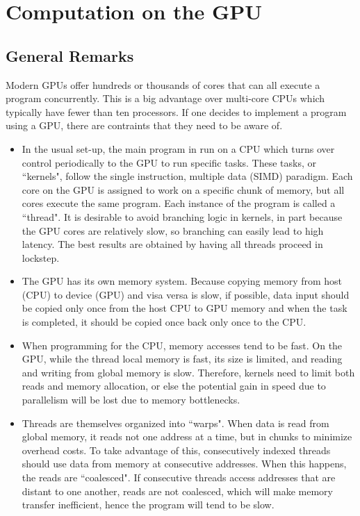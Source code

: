 \section{Computation on the GPU}
\label{sec:computation}
\subsection{General Remarks}
Modern GPUs offer hundreds or thousands of cores that can all execute a program concurrently. This is a big advantage over multi-core CPUs which typically have fewer than ten processors. If one decides to implement a program using a GPU, there are contraints that they need to be aware of.
\begin{itemize}
\item
In the usual set-up, the main program in run on a CPU which turns over control periodically to the GPU to run specific tasks. These tasks, or ``kernels", follow the single instruction, multiple data (SIMD) paradigm. Each core on the GPU is assigned to work on a specific chunk of memory, but all cores execute the same program. Each instance of the program is called a ``thread". It is desirable to avoid branching logic in kernels, in part because the GPU cores are relatively slow, so branching can easily lead to high latency. The best results are obtained by having all threads proceed in lockstep.

\item
The GPU has its own memory system. Because copying memory from host (CPU) to device (GPU) and visa versa is slow, if possible, data input should be copied only once from the host CPU to GPU memory and when the task is completed, it should be copied once back only once to the CPU.

\item
When programming for the CPU, memory accesses tend to be fast. On the GPU, while the thread local memory is fast, its size is limited, and reading and writing from global memory is slow. Therefore, kernels need to limit both reads and memory allocation, or else the potential gain in speed due to parallelism will be lost due to memory bottlenecks.

\item
Threads are themselves organized into ``warps". When data is read from global memory, it reads not one address at a time, but in chunks to minimize overhead costs. To take advantage of this, consecutively indexed threads should use data from memory at consecutive addresses. When this happens, the reads are ``coalesced". If consecutive threads access addresses that are distant to one another, reads are not coalesced, which will make memory transfer inefficient, hence the program will tend to be slow.
\end{itemize}

